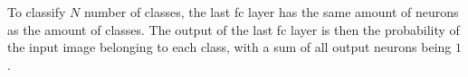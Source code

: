 To classify $N$ number of classes, the last \gls{fc} layer has the same amount of neurons as the amount of classes. The output of the last \gls{fc} layer is then the probability of the input image belonging to each class, with a sum of all output neurons being $1$ \citep{Karpathy2016b}.



